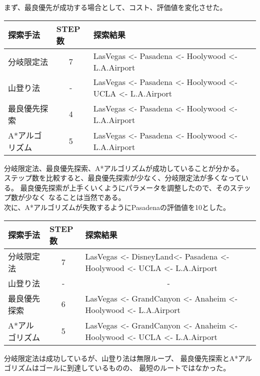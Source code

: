 \documentclass{jarticle}
\begin{document}
まず、最良優先が成功する場合として、コスト、評価値を変化させた。
\begin{table}[h]
  \begin{tabular}{|l|c|l|}
    \hline
    探索手法       & \multicolumn{1}{l|}{STEP数} & 探索結果                                                                                         \\ \hline
    分岐限定法     & 7                           & LasVegas \textless{}- Pasadena \textless{}- Hoolywood \textless{}- L.A.Airport                   \\ \hline
    山登り法       & -                           & LasVegas \textless{}- Pasadena \textless{}- Hoolywood \textless{}- UCLA \textless{}- L.A.Airport \\ \hline
    最良優先探索   & 4                           & LasVegas \textless{}- Pasadena \textless{}- Hoolywood \textless{}- L.A.Airport                   \\ \hline
    A*アルゴリズム & 5                           & LasVegas \textless{}- Pasadena \textless{}- Hoolywood \textless{}- L.A.Airport                   \\ \hline
  \end{tabular}
\end{table}
分岐限定法、最良優先探索、A*アルゴリズムが成功していることが分かる。\\
ステップ数を比較すると、最良優先探索が少なく、分岐限定法が多くなっている。
最良優先探索が上手くいくようにパラメータを調整したので、そのステップ数が少なく
なることは当然である。\\

次に、A*アルゴリズムが失敗するようにPasadenaの評価値を10とした。
\begin{table}[ht]
  \begin{tabular}{|l|c|l|}
    \hline
    探索手法       & \multicolumn{1}{l|}{STEP数} & 探索結果                                                                                                                 \\ \hline
    分岐限定法     & 7                           & LasVegas \textless{}- DisneyLand\textless{}- Pasadena \textless{}- Hoolywood \textless{}- UCLA \textless{}- L.A.Airport  \\ \hline
    山登り法       & -                           & \multicolumn{1}{c|}{-}                                                                                                   \\ \hline
    最良優先探索   & 6                           & LasVegas \textless{}- GrandCanyon \textless{}- Anaheim \textless{}- Hoolywood \textless{}- L.A.Airport                   \\ \hline
    A*アルゴリズム & 5                           & LasVegas \textless{}- GrandCanyon \textless{}- Anaheim \textless{}- Hoolywood \textless{}- UCLA \textless{}- L.A.Airport \\ \hline
  \end{tabular}
\end{table}
分岐限定法は成功しているが、山登り法は無限ループ、
最良優先探索とA*アルゴリズムはゴールに到達しているものの、
最短のルートではなかった。
\end{document}
